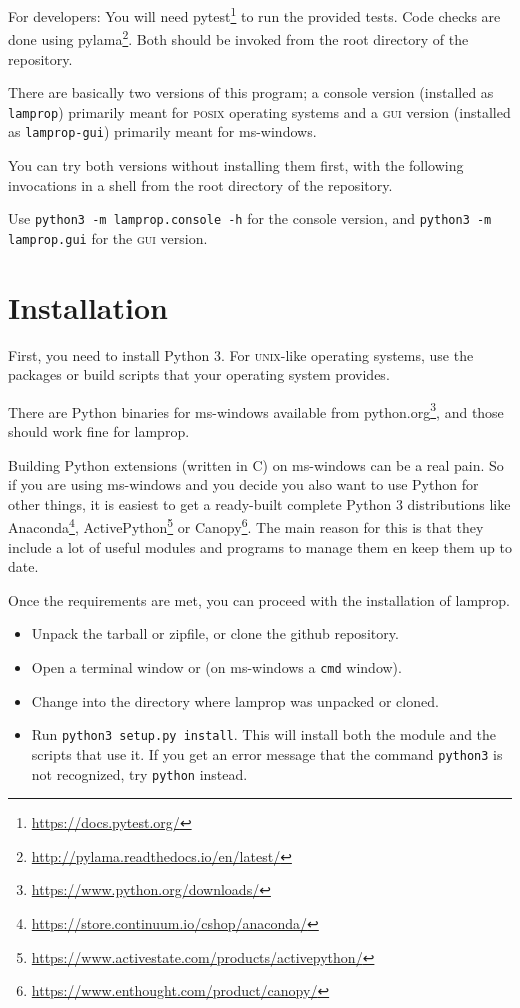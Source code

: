 \documentclass[a4paper,landscape,oneside,11pt,twocolumn]{memoir}
\begin{document}
For developers: You will need pytest\footnote{\url{https://docs.pytest.org/}}
to run the provided tests. Code checks are done using
pylama\footnote{\url{http://pylama.readthedocs.io/en/latest/}}. Both should be
invoked from the root directory of the repository.

There are basically two versions of this program; a console version (installed
as \texttt{lamprop}) primarily meant for \textsc{posix} operating systems and
a \textsc{gui} version (installed as \texttt{lamprop-gui}) primarily meant for
ms-windows.

You can try both versions without installing them first, with the following
invocations in a shell from the root directory of the repository.

Use \texttt{python3 -m lamprop.console -h} for the console version, and
\texttt{python3 -m lamprop.gui} for the \textsc{gui} version.

\section{Installation} %

First, you need to install Python 3. For \textsc{unix}-like operating systems,
use the packages or build scripts that your operating system provides.

There are Python binaries for ms-windows available from
python.org\footnote{\url{https://www.python.org/downloads/}}, and those should
work fine for lamprop.

Building Python extensions (written in C) on ms-windows can be a real pain. So
if you are using ms-windows and you decide you also want to use Python for
other things, it is easiest to get a ready-built complete Python
3 distributions like
Anaconda\footnote{\url{https://store.continuum.io/cshop/anaconda/}},
ActivePython\footnote{\url{https://www.activestate.com/products/activepython/}}
or Canopy\footnote{\url{https://www.enthought.com/product/canopy/}}. The main
reason for this is that they include a lot of useful modules and programs to
manage them en keep them up to date.

Once the requirements are met, you can proceed with the installation of lamprop.

\begin{itemize}
    \item Unpack the tarball or zipfile, or clone the github repository.
    \item Open a terminal window or (on ms-windows a \texttt{cmd} window).
    \item Change into the directory where lamprop was unpacked or cloned.
    \item Run \texttt{python3 setup.py install}. This will install both the module and
        the scripts that use it. If you get an error message that the command
        \texttt{python3} is not recognized, try \texttt{python} instead.
\end{itemize}
\end{document}

